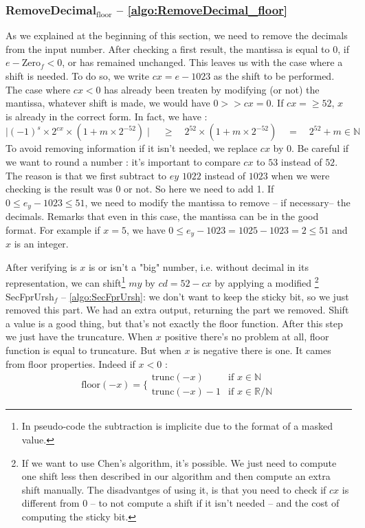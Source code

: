\documentclass[runningheads]{llncs}
\begin{document}
  \subsubsection{RemoveDecimal$_\text{floor}$ -- \autoref{algo:RemoveDecimal_floor}}
  As we explained at the beginning of this section, we need to remove the decimals from the input number.
  After checking a first result, the mantissa is equal to 0, if $e-\text{Zero}_f<0$, or has remained unchanged.
  This leaves us with the case where a shift is needed. To do so, we write $cx = e - 1023$ as the shift to be performed.
  The case where $cx<0$ has already been treaten by modifying (or not) the mantissa, whatever shift is made, we would have $0>>cx = 0$.
  If $cx=\geq52$, $x$ is already in the correct form. In fact, we have : 
  $$\mid (-1)^s \times 2^{cx} \times(1+m\times 2^{-52})\mid \quad \geq \quad 2^{52} \times(1+m\times 2^{-52})\quad = \quad2^{52} + m \in \mathbb{N}$$
  To avoid removing information if it isn't needed, we replace $cx$ by $0$.
  Be careful if we want to round a number : it's important to compare $cx$ to $53$ instead of $52$. The reason is that we first subtract to $ey$ $1022$ instead of $1023$ when we were checking is the result was 0 or not. So here we need to add 1.
  If $0\leq e_y - 1023 \leq 51$, we need to modify the mantissa to remove -- if necessary-- the decimals.
  Remarks that even in this case, the mantissa can be in the good format. For example if $x = 5$, we have $0\leq e_y-1023 = 1025-1023 = 2 \leq 51$ and $x$ is an integer.
  
  After verifying is $x$ is or isn't a "big" number, i.e. without decimal in its representation, we can shift\footnote{
  In pseudo-code the subtraction is implicite due to the format of a masked value.} $my$ by $cd=52-cx$ by applying a modified \footnote{If
  we want to use Chen's algorithm, it's possible. We just need to compute one shift less then described in our algorithm and then compute an extra shift manually. The disadvantges of using it, is that you need to check if $cx$ is different from $0$ 
  -- to not compute a shift if it isn't needed -- and the cost of computing the sticky bit.} SecFprUrsh$_f$ -- \autoref{algo:SecFprUrsh}: 
  we don't want to keep the sticky bit, so we just removed this part.
  We had an extra output, returning the part we removed.
  Shift a value is a good thing, but that's not exactly the floor function. After this step we just have the truncature.
  When $x$ positive there's no problem at all, floor function is equal to truncature. But when $x$ is negative there is one. It cames from floor properties. Indeed if $x<0$ : 
  \begin{equation}
      \label{eq:floorneg}
      \text{floor}(-x)  = \Bigg\{ \begin{array}{cc}
          \text{trunc}(-x) &  \text{if } x\in\mathbb{N}\\
          \text{trunc}(-x) -1 &  \text{if } x\in\mathbb{R}/\mathbb{N}
       \end{array}
  \end{equation}
\end{document}
